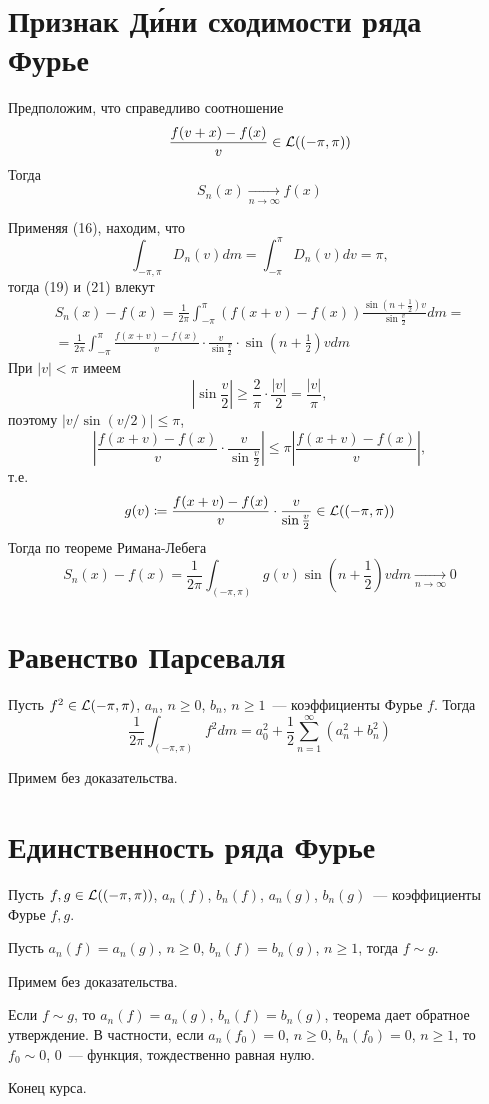 \documentclass[main]{subfiles}
\begin{document}
\section{Признак \texorpdfstring{Д\'ини}{Дини} сходимости ряда Фурье}
\begin{theorem}
    Предположим, что справедливо соотношение
    \[\frac{f(v + x) - f(x)}{v} \in \mathcal{L}((-\pi, \pi))\]
    Тогда
    \[S_n(x) \xrightarrow[n \to \infty]{} f(x) \tag{20}\]
\end{theorem}
\begin{longProof}
    Применяя (16), находим, что
    \[\int_{-\pi, \pi} D_n(v) dm = \int_{-\pi}^{\pi} D_n(v) dv = \pi, \tag{21}\]
    тогда (19) и (21) влекут
    \begin{multline*}
        S_n(x) - f(x) = \frac{1}{2 \pi} \int_{-\pi}^{\pi} (f(x + v) - f(x))  \frac{\sin \left(n + \frac{1}{2}\right)v}{\sin \frac{v}{2}} dm = \\
        = \frac{1}{2 \pi} \int_{-\pi}^{\pi} \frac{f(x + v) - f(x)}{v} \cdot \frac{v}{\sin \frac{v}{2}} \cdot \sin\left(n + \frac{1}{2}\right) v dm \tag{22}
    \end{multline*}
    При $|v| < \pi$ имеем
    \[\left|\sin \frac{v}{2}\right| \ge \frac{2}{\pi} \cdot \frac{|v|}{2} = \frac{|v|}{\pi},\]
    поэтому $|v / \sin(v / 2)| \le \pi$,
    \[\left|\frac{f(x + v) - f(x)}{v} \cdot \frac{v}{\sin \frac{v}{2}}\right| \le \pi \left|\frac{f(x + v) - f(x)}{v}\right|,\]
    т.е.
    \[g(v) \coloneq \frac{f(x + v) - f(x)}{v} \cdot \frac{v}{\sin \frac{v}{2}} \in \mathcal{L}((-\pi, \pi))\]
    Тогда по теореме Римана-Лебега
    \[S_n(x) - f(x) = \frac{1}{2 \pi} \int_{(-\pi, \pi)} g(v) \sin\left(n + \frac{1}{2}\right) v dm \xrightarrow[n \to \infty]{} 0\]
\end{longProof}

\section{Равенство Парсеваля}
\begin{theorem}
    Пусть $f^2 \in \mathcal{L}(-\pi, \pi)$, $a_n$, $n \ge 0$, $b_n$, $n \ge 1$~--- коэффициенты Фурье $f$.
    Тогда
    \[\frac{1}{2 \pi} \int_{(-\pi, \pi)} f^2 dm = a^2_0 + \frac{1}{2} \sum_{n=1}^{\infty} (a^2_n + b^2_n)\]
\end{theorem}
Примем без доказательства.

\section{Единственность ряда Фурье}
\begin{theorem}
    Пусть $f, g \in \mathcal{L}((-\pi, \pi))$, $a_n(f)$, $b_n(f)$, $a_n(g)$, $b_n(g)$~--- коэффициенты Фурье $f, g$.

    Пусть $a_n(f) = a_n(g)$, $n \ge 0$, $b_n(f) = b_n(g)$, $n \ge 1$, тогда $f \sim g$.
\end{theorem}
Примем без доказательства.

Если $f \sim g$, то $a_n(f) = a_n(g)$, $b_n(f) = b_n(g)$, теорема дает обратное утверждение.
В частности, если $a_n(f_0) = 0$, $n \ge 0$, $b_n(f_0) = 0$, $n \ge 1$, то $f_0 \sim 0$, $0$~--- функция, тождественно равная нулю.

Конец курса.
\end{document}
